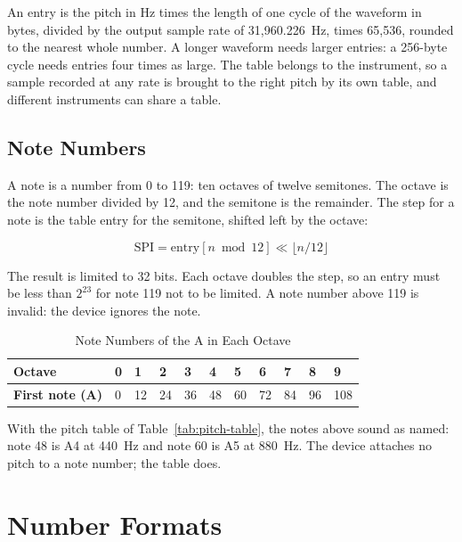 An entry is the pitch in Hz times the length of one cycle of the waveform in bytes, divided by the output sample rate
of 31,960.226~Hz, times 65,536, rounded to the nearest whole number. A longer waveform needs larger entries: a 256-byte
cycle needs entries four times as large. The table belongs to the instrument, so a sample recorded at any rate is
brought to the right pitch by its own table, and different instruments can share a table.

\subsection{Note Numbers}
\label{sec:note-numbers}

A note is a number from 0 to 119: ten octaves of twelve semitones. The octave is the note number divided by 12, and the
semitone is the remainder. The step for a note is the table entry for the semitone, shifted left by the octave:

\begin{equation*}
	\mathrm{SPI} = \mathrm{entry}[n \bmod 12] \ll \lfloor n / 12 \rfloor
\end{equation*}

\noindent The result is limited to 32 bits. Each octave doubles the step, so an entry must be less than $2^{23}$ for
note 119 not to be limited. A note number above 119 is invalid: the device ignores the note.

\begin{table}[H]
	\centering
	\begin{tabular}{lllllllllll}
		\toprule
		\textbf{Octave}         & 0 & 1  & 2  & 3  & 4  & 5  & 6  & 7  & 8  & 9   \\
		\midrule
		\textbf{First note (A)} & 0 & 12 & 24 & 36 & 48 & 60 & 72 & 84 & 96 & 108 \\
		\bottomrule
	\end{tabular}
	\caption{Note Numbers of the A in Each Octave}
	\label{tab:note-numbers}
\end{table}

With the pitch table of Table~\ref{tab:pitch-table}, the notes above sound as named: note 48 is A4 at 440~Hz and note
60 is A5 at 880~Hz. The device attaches no pitch to a note number; the table does.

\section{Number Formats}
\label{sec:number-formats}

